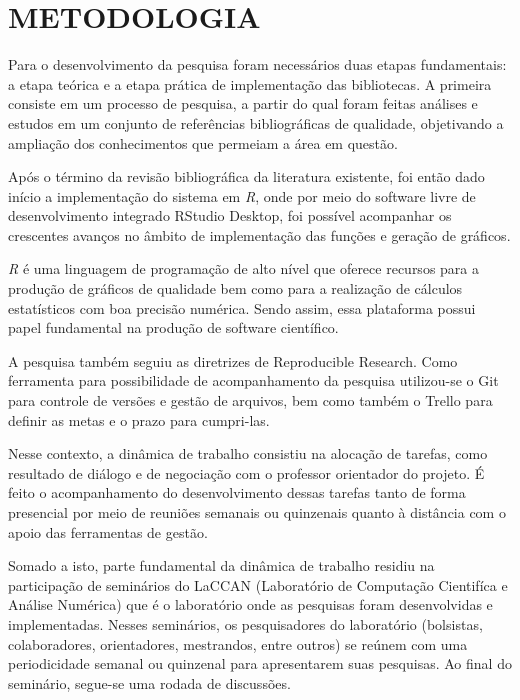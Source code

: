 \documentclass[12pt,letterpaper]{article}
\begin{document}

\newpage
\section*{\centering \textbf{METODOLOGIA}} %

Para o desenvolvimento da pesquisa foram necessários duas etapas fundamentais: a etapa teórica e a etapa prática de implementação das bibliotecas.
A primeira consiste em um processo de pesquisa, a partir do qual foram feitas análises e estudos em um conjunto de referências bibliográficas de qualidade, objetivando a ampliação dos conhecimentos que permeiam a área em questão. 

Após o término da revisão bibliográfica da literatura existente, foi então dado início a implementação do sistema em \textit{R}\cite{RCore}, onde por meio do software livre de desenvolvimento integrado RStudio Desktop, foi possível acompanhar os crescentes avanços no âmbito de implementação das funções e geração de gráficos.

\textit{R} é uma linguagem de programação de alto nível que oferece recursos para a	produção de gráficos de qualidade bem como para	 a realização de cálculos estatísticos com boa precisão numérica. Sendo assim, essa plataforma possui papel fundamental na produção de software científico.

A pesquisa também seguiu as diretrizes de Reproducible Research\cite{ReproducibleResearch}. Como ferramenta para possibilidade de acompanhamento da pesquisa utilizou-se o Git para controle de versões e gestão de arquivos, bem como também o Trello para definir as metas e o prazo para cumpri-las.

Nesse contexto, a dinâmica de trabalho consistiu na alocação de tarefas, como resultado de diálogo e de negociação com o professor orientador do projeto. É feito o acompanhamento do desenvolvimento dessas tarefas tanto de forma presencial por meio de reuniões semanais ou quinzenais quanto à distância com o apoio das ferramentas de gestão.

	Somado a isto, parte fundamental da dinâmica de trabalho residiu na participação de seminários do LaCCAN (Laboratório de Computação Cientifíca e Análise Numérica) que é o laboratório onde as pesquisas foram desenvolvidas e implementadas. Nesses seminários, os pesquisadores do laboratório (bolsistas, colaboradores, orientadores, mestrandos, entre outros) se reúnem com uma periodicidade semanal ou quinzenal para apresentarem suas pesquisas. Ao final do seminário, segue-se uma rodada de discussões.
    
\end{document}

